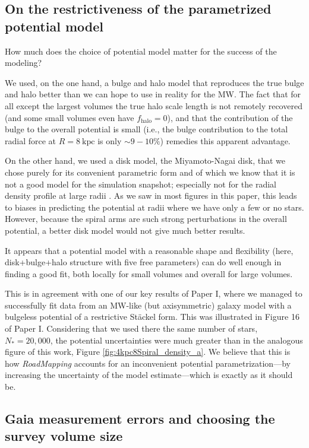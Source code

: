 \documentclass[iop,revtex4,numberedappendix,appendixfloats]{emulateapj}
\newcommand{\RM}{{\sl RoadMapping}}
\begin{document}
\subsection{On the restrictiveness of the parametrized potential model}

How much does the choice of potential model matter for the success of the modeling?

We used, on the one hand, a bulge and halo model that reproduces the true bulge and halo better than we can hope to use in reality for the MW. The fact that for all except the largest volumes the true halo scale length is not remotely recovered (and some small volumes even have $f_\text{halo}=0$), and that the contribution of the bulge to the overall potential is small (i.e., the bulge contribution to the total radial force at $R=8~\text{kpc}$ is only $\sim 9-10\%$) remedies this apparent advantage. 

On the other hand, we used a disk model, the Miyamoto-Nagai disk, that we chose purely for its convenient parametric form and of which we know that it is not a good model for the simulation snapshot; especially not for the radial density profile at large radii \citep{2015MNRAS.448.2934S}. As we saw in most figures in this paper, this leads to biases in predicting the potential at radii where we have only a few or no stars. However, because the spiral arms are such strong perturbations in the overall potential, a better disk model would not give much better results.

It appears that a potential model with a reasonable shape and flexibility (here, disk+bulge+halo structure with five free parameters) can do well enough in finding a good fit, both locally for small volumes and overall for large volumes.

This is in agreement with one of our key results of Paper I, where we managed to successfully fit data from an MW-like (but axisymmetric) galaxy model with a bulgeless potential of a restrictive St\"ackel form. This was illustrated in Figure 16 of Paper I. Considering that we used there the same number of stars, $N_*=20,000$, the potential uncertainties were much greater than in the analogous figure of this work, Figure \ref{fig:4kpc8Spiral_density_a}. We believe that this is how \RM{} accounts for an inconvenient potential parametrization---by increasing the uncertainty of the model estimate---which is exactly as it should be.

\subsection{Gaia measurement errors and choosing the survey volume size} \label{sec:discussion_choosing_SV}
\end{document}
